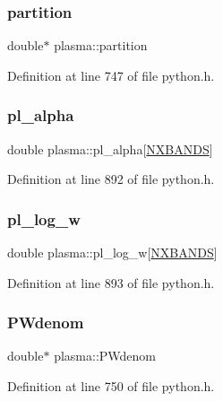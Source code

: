 \subsubsection{\texorpdfstring{partition}{partition}}
{\footnotesize\ttfamily double$\ast$ plasma\+::partition}



Definition at line 747 of file python.\+h.

\mbox{\label{structplasma_a0dbad3f32ea372492eb73eda0f123899}} 
\subsubsection{\texorpdfstring{pl\+\_\+alpha}{pl\_alpha}}
{\footnotesize\ttfamily double plasma\+::pl\+\_\+alpha\mbox{[}\hyperlink{python_8h_ac640b7fc429348ef2f6781704d3c5163}{N\+X\+B\+A\+N\+DS}\mbox{]}}



Definition at line 892 of file python.\+h.

\mbox{\label{structplasma_aae85efc36fb767cfec53df4cd3327fe8}} 
\subsubsection{\texorpdfstring{pl\+\_\+log\+\_\+w}{pl\_log\_w}}
{\footnotesize\ttfamily double plasma\+::pl\+\_\+log\+\_\+w\mbox{[}\hyperlink{python_8h_ac640b7fc429348ef2f6781704d3c5163}{N\+X\+B\+A\+N\+DS}\mbox{]}}



Definition at line 893 of file python.\+h.

\mbox{\label{structplasma_a2b0e1368d0adfd432627a2ceedebb704}} 
\subsubsection{\texorpdfstring{P\+Wdenom}{PWdenom}}
{\footnotesize\ttfamily double$\ast$ plasma\+::\+P\+Wdenom}



Definition at line 750 of file python.\+h.

